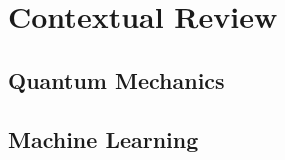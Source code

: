 
%         

\part{Contextual Review}\label{part:contextual_review}
    \chapter{Quantum Mechanics}\label{chapter:qm}
        
    \chapter{Machine Learning}\label{chapter:ml}
        

%         

